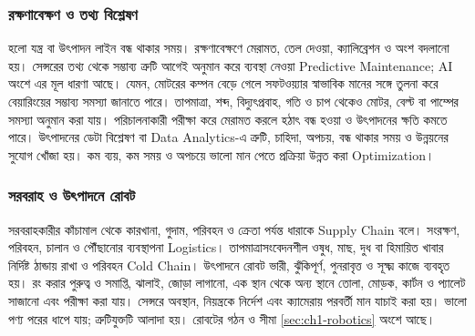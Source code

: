 \subsubsection{রক্ষণাবেক্ষণ ও তথ্য বিশ্লেষণ}
 হলো যন্ত্র বা উৎপাদন লাইন বন্ধ থাকার সময়। রক্ষণাবেক্ষণে মেরামত, তেল দেওয়া, ক্যালিব্রেশন ও অংশ বদলানো হয়। সেন্সরের তথ্য থেকে সম্ভাব্য ত্রুটি আগেই অনুমান করে ব্যবস্থা নেওয়া Predictive Maintenance; AI অংশে এর মূল ধারণা আছে।
যেমন, মোটরের কম্পন বেড়ে গেলে সফটওয়্যার স্বাভাবিক মানের সঙ্গে তুলনা করে বেয়ারিংয়ের সম্ভাব্য সমস্যা জানাতে পারে। তাপমাত্রা, শব্দ, বিদ্যুৎপ্রবাহ, গতি ও চাপ থেকেও মোটর, বেল্ট বা পাম্পের সমস্যা অনুমান করা যায়। পরিচালনাকারী পরীক্ষা করে মেরামত করলে হঠাৎ বন্ধ হওয়া ও উৎপাদনের ক্ষতি কমতে পারে।
উৎপাদনের ডেটা বিশ্লেষণ বা Data Analytics-এ ত্রুটি, চাহিদা, অপচয়, বন্ধ থাকার সময় ও উন্নয়নের সুযোগ খোঁজা হয়। কম ব্যয়, কম সময় ও অপচয়ে ভালো মান পেতে প্রক্রিয়া উন্নত করা Optimization।
\subsubsection{সরবরাহ ও উৎপাদনে রোবট}
সরবরাহকারীর কাঁচামাল থেকে কারখানা, গুদাম, পরিবহন ও ক্রেতা পর্যন্ত ধারাকে Supply Chain বলে। সংরক্ষণ, পরিবহন, চালান ও পৌঁছানোর ব্যবস্থাপনা Logistics। তাপমাত্রাসংবেদনশীল ওষুধ, মাছ, দুধ বা হিমায়িত খাবার নির্দিষ্ট ঠান্ডায় রাখা ও পরিবহন Cold Chain।
উৎপাদনে রোবট ভারী, ঝুঁকিপূর্ণ, পুনরাবৃত্ত ও সূক্ষ্ম কাজে ব্যবহৃত হয়। রং করার পুরুত্ব ও সমাপ্তি, ঝালাই, জোড়া লাগানো, এক স্থান থেকে অন্য স্থানে তোলা, মোড়ক, কার্টন ও প্যালেট সাজানো এবং পরীক্ষা করা যায়। সেন্সরে অবস্থান, নিয়ন্ত্রকে নির্দেশ এবং ক্যামেরায় পরবর্তী মান যাচাই করা হয়। ভালো পণ্য পরের ধাপে যায়; ত্রুটিযুক্তটি আলাদা হয়। রোবটের গঠন ও সীমা \ref{sec:ch1-robotics} অংশে আছে।

